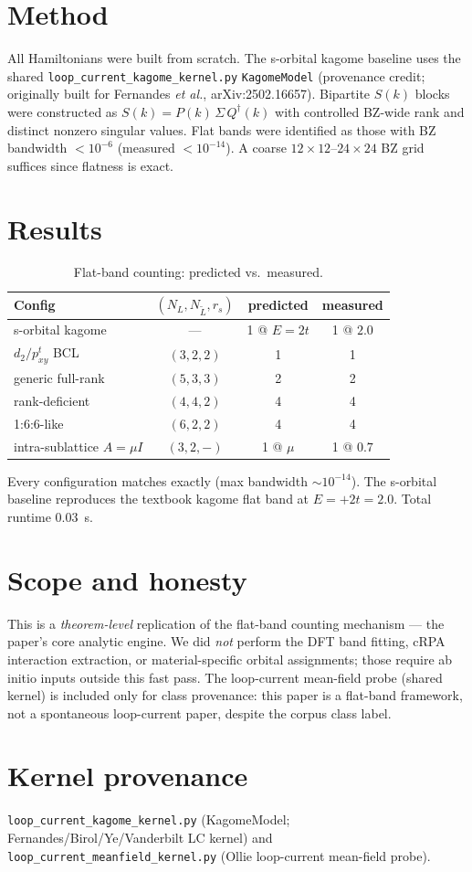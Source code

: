 \documentclass[aps,prb,twocolumn,superscriptaddress]{revtex4-2}
\begin{document}
\section{Method}
All Hamiltonians were built from scratch. The s-orbital kagome baseline uses the
shared \texttt{loop\_current\_kagome\_kernel.py} \texttt{KagomeModel} (provenance
credit; originally built for Fernandes \emph{et al.}, arXiv:2502.16657). Bipartite
$S(k)$ blocks were constructed as $S(k)=P(k)\,\Sigma\,Q^\dagger(k)$ with controlled
BZ-wide rank and distinct nonzero singular values. Flat bands were identified as
those with BZ bandwidth $<10^{-6}$ (measured $<10^{-14}$). A coarse
$12\times12$--$24\times24$ BZ grid suffices since flatness is exact.

\section{Results}
\begin{table}[h]
\caption{Flat-band counting: predicted vs.\ measured.}
\begin{tabular}{lccc}
\hline\hline
Config & $(N_L,N_{\tilde L},r_s)$ & predicted & measured\\
\hline
s-orbital kagome & --- & 1 @ $E{=}2t$ & 1 @ $2.0$\\
$d_2/p^t_{xy}$ BCL & $(3,2,2)$ & 1 & 1\\
generic full-rank & $(5,3,3)$ & 2 & 2\\
rank-deficient & $(4,4,2)$ & 4 & 4\\
1:6:6-like & $(6,2,2)$ & 4 & 4\\
intra-sublattice $A{=}\mu I$ & $(3,2,-)$ & 1 @ $\mu$ & 1 @ $0.7$\\
\hline\hline
\end{tabular}
\end{table}

Every configuration matches exactly (max bandwidth $\sim10^{-14}$). The s-orbital
baseline reproduces the textbook kagome flat band at $E=+2t=2.0$. Total runtime
$0.03$~s.

\section{Scope and honesty}
This is a \emph{theorem-level} replication of the flat-band counting mechanism —
the paper's core analytic engine. We did \emph{not} perform the DFT band fitting,
cRPA interaction extraction, or material-specific orbital assignments; those
require ab initio inputs outside this fast pass. The loop-current mean-field probe
(shared kernel) is included only for class provenance: this paper is a flat-band
framework, not a spontaneous loop-current paper, despite the corpus class label.

\section*{Kernel provenance}
\texttt{loop\_current\_kagome\_kernel.py} (KagomeModel; Fernandes/Birol/Ye/Vanderbilt
LC kernel) and \texttt{loop\_current\_meanfield\_kernel.py} (Ollie loop-current
mean-field probe).
\end{document}
